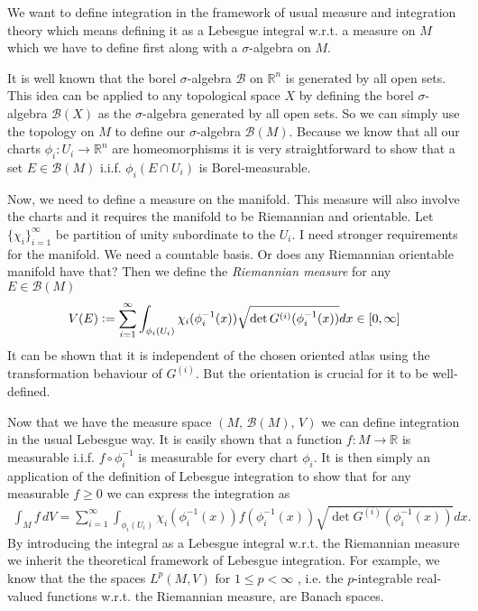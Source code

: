 \documentclass[12pt,a4paper]{article}
\numberwithin{equation}{subsection}
\numberwithin{lemma}{subsection}
\theoremstyle{definition}
\newcommand{\real}{\mathbb{R}}
\begin{document}
We want to define integration in the framework of usual measure and integration
theory which means defining it as a Lebesgue integral w.r.t. a measure on $M$
which we have to define first along with a $\sigma$-algebra on $M$. 

It is well known that
the borel $\sigma$-algebra $\mathcal{B}$ on $\real^n$ is generated
by all open sets. This idea can be applied to any topological space $X$ by 
defining the borel $\sigma$-algebra $\mathcal{B}(X)$ as the $\sigma$-algebra 
generated by all open sets. So we can simply use the topology on $M$ to define 
our $\sigma$-algebra $\mathcal{B}(M)$. Because we know that all our 
charts $\phi_i: U_i \rightarrow \real^n$ are homeomorphisms it is very 
straightforward to show that a set $E \in \mathcal{B}(M)$ i.i.f.
$\phi_i(E \cap U_i)$ is Borel-measurable. 

Now, we need to define a measure on the manifold. This measure will 
also involve the charts and it requires the manifold to be Riemannian 
and orientable. Let $\{ \chi_i \}_{i=1}^\infty$ be partition of unity 
subordinate to the $U_i$. {\color{red} I need stronger 
requirements for the manifold. We need a countable basis. Or does any 
Riemannian orientable manifold have that?}  Then we define the 
\textit{Riemannian measure} for any $E \in \mathcal{B}(M)$
\begin{align*}
    V(E) \vcentcolon= \sum\limits_{i=1}^\infty \int_{\phi_i(U_i)}
        \chi_i(\phi_i^{-1}(x)) \sqrt{\det G^{(i)}(\phi_i^{-1}(x))} dx 
        \in [0,\infty]
\end{align*}
It can be shown that it is independent of the chosen oriented atlas 
using the transformation behaviour of $G^{(i)}$. But the orientation is 
crucial for it to be well-defined. 

Now that we have the measure space $(M, \, \mathcal{B}(M), \, V)$
we can define integration in the usual Lebesgue way.
It is easily shown that a function $f: M \rightarrow \real$ is measurable 
i.i.f. $f \circ \phi_i^{-1}$ is measurable for every chart $\phi_i$. 
It is then simply an application of the definition of Lebesgue integration to
show that for any measurable $f \geq 0$ we can express the integration as
\begin{align*}
    \int_M f \, dV = \sum\limits_{i=1}^\infty \int_{\phi_i(U_i)} 
        \chi_i(\phi_i^{-1}(x)) f(\phi_i^{-1}(x)) 
        \sqrt{\det G^{(i)}(\phi_i^{-1}(x))} dx.
\end{align*}
By introducing the integral as a Lebesgue integral w.r.t. the Riemannian 
measure we inherit the theoretical framework of Lebesgue integration. 
For example, we know that the the spaces $L^p(M,V)$ for $1\leq p < \infty$
, i.e. the $p$-integrable 
real-valued functions w.r.t. the Riemannian measure, are Banach spaces.
\end{document}
